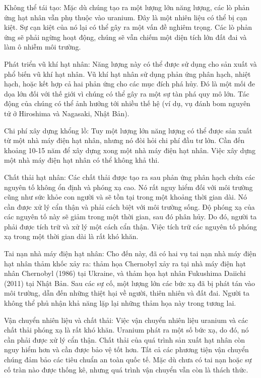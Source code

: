 \begin{enumerate}[label=\bfseries Câu \arabic*:]
{		Không thể tái tạo: Mặc dù chúng tạo ra một lượng lớn năng lượng, các lò phản ứng hạt nhân vẫn phụ thuộc vào uranium. Đây là một nhiên liệu có thể bị cạn kiệt. Sự cạn kiệt của nó lại có thể gây ra một vấn đề nghiêm trọng. Các lò phản ứng sẽ phải ngừng hoạt động, chúng sẽ vẫn chiếm một diện tích lớn đất đai và làm ô nhiễm môi trường.
		
		Phát triển vũ khí hạt nhân: Năng lượng này có thể được sử dụng cho sản xuất và phổ biến vũ khí hạt nhân. Vũ khí hạt nhân sử dụng phản ứng phân hạch, nhiệt hạch, hoặc kết hợp cả hai phản ứng cho các mục đích phá hủy. Đó là một mối đe dọa lớn đối với thế giới vì chúng có thể gây ra một sự tàn phá quy mô lớn. Tác động của chúng có thể ảnh hưởng tới nhiều thế hệ (ví dụ, vụ đánh bom nguyên tử ở Hiroshima và Nagasaki, Nhật Bản).
		
		Chi phí xây dựng khổng lồ: Tuy một lượng lớn năng lượng có thể được sản xuất từ một nhà máy điện hạt nhân, nhưng nó đòi hỏi chi phí đầu tư lớn. Cần đến khoảng 10-15 năm để xây dựng xong một nhà máy điện hạt nhân. Việc xây dựng một nhà máy điện hạt nhân có thể không khả thi.
		
		Chất thải hạt nhân: Các chất thải được tạo ra sau phản ứng phân hạch chứa các nguyên tố không ổn định và phóng xạ cao. Nó rất nguy hiểm đối với môi trường cũng như sức khỏe con người và sẽ tồn tại trong một khoảng thời gian dài. Nó cần được xử  lý cẩn thận và phải cách biệt với môi trường sống. Độ phóng xạ của các nguyên tố này sẽ giảm trong một thời gian, sau đó phân hủy. Do đó, người ta phải được tích trữ và xử lý một cách cẩn thận. Việc tích trữ các nguyên tố phóng xạ trong một thời gian dài là rất khó khăn.
		
		Tai nạn nhà máy điện hạt nhân: Cho đến này, đã có hai vụ tai nạn nhà máy điện hạt nhân thảm khốc xảy ra: thảm họa Chernobyl xảy ra tại nhà máy điện hạt nhân Chernobyl (1986) tại Ukraine, và thảm họa hạt nhân Fukushima Daiichi (2011) tại Nhật Bản. Sau các sự cố, một lượng lớn các bức xạ đã bị phát tán vào môi trường, dẫn đến những thiệt hại về người, thiên nhiên và đất đai. Người ta không thể phủ nhận khả năng lặp lại những thảm họa này trong tương lai.
		
		Vận chuyển nhiên liệu và chất thải: Việc vận chuyển nhiên liệu uranium và các chất thải phóng xạ là rất khó khăn. Uranium phát ra một số bức xạ, do đó, nó cần phải được xử lý cẩn thận. Chất thải của quá trình sản xuất hạt nhân còn nguy hiểm hơn và cần được bảo vệ tốt hơn. Tất cả các phương tiện vận chuyển chúng đảm bảo các tiêu chuẩn an toàn quốc tế. Mặc dù chưa có tai nạn hoặc sự cố tràn nào được thống kê, nhưng quá trình vận chuyển vẫn còn là thách thức.
		
}
\end{enumerate}
